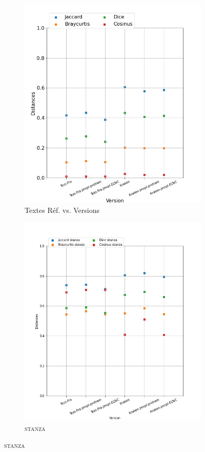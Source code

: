 \begin{figure}[H]
\begin{minipage}{6cm}
  \begin{subfigure}{0.89\textwidth}
  \includegraphics[width=.89\textwidth]{IMAGES/ELTeC_DISTANCES_spaCy3.5.1/ADAM-graph-dist-spaCy3.5.1-txt.png} 
  \caption{Textes Réf. vs. Versions}
  \label{fig:ADAM-graph-dist-txt}
  \end{subfigure}
  \end{minipage}
  \begin{minipage}{6cm}
  \begin{subfigure}{0.89\textwidth}
  \includegraphics[width=.89\textwidth]{IMAGES/ELTeC_DISTANCES_stanza/ADAM-graph-dist-stanza-stanza.png}
   \caption{\textsc{stanza}}
 

\end{subfigure}
\end{minipage}
\end{figure}
